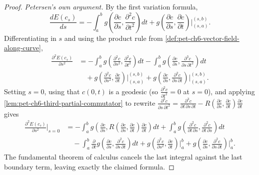 \begin{proof}
  \emph{Petersen's own argument.}
  By the first variation formula,
  \[
    \frac{dE(c_s)}{ds}=-\int_a^bg\!\left(\frac{\partial c}{\partial s},
    \frac{\partial^2c}{\partial t^2}\right)dt
    +g\!\left(\frac{\partial c}{\partial s},\frac{\partial c}{\partial t}\right)\Big|_{(s,a)}^{(s,b)}.
  \]
  Differentiating in $s$ and using the product rule from
  \cref{def:pet-ch6-vector-field-along-curve},
  \begin{align*}
    \frac{\partial^2E(c_s)}{\partial s^2}
    &=-\int_a^bg\!\left(\frac{\partial^2c}{\partial s^2},\frac{\partial^2c}{\partial t^2}\right)dt
    -\int_a^bg\!\left(\frac{\partial c}{\partial s},
    \frac{\partial^3c}{\partial s\,\partial t^2}\right)dt\\
    &\quad+g\!\left(\frac{\partial^2c}{\partial s^2},\frac{\partial c}{\partial t}\right)\Big|_{(s,a)}^{(s,b)}
    +g\!\left(\frac{\partial c}{\partial s},\frac{\partial^2c}{\partial s\,\partial t}\right)\Big|_{(s,a)}^{(s,b)}.
  \end{align*}
  Setting $s=0$, using that $c(0,t)$ is a geodesic (so
  $\frac{\partial^2c}{\partial t^2}=0$ at $s=0$), and applying
  \cref{lem:pet-ch6-third-partial-commutator} to rewrite
  $\frac{\partial^3c}{\partial s\,\partial t^2}
  =\frac{\partial^3c}{\partial t\,\partial s\,\partial t}
  -R\!\left(\frac{\partial c}{\partial s},\frac{\partial c}{\partial t}\right)\frac{\partial c}{\partial t}$
  gives
  \begin{align*}
    \frac{\partial^2E(c_s)}{\partial s^2}\bigg|_{s=0}
    &=-\int_a^bg\!\left(\frac{\partial c}{\partial s},R\!\left(\frac{\partial c}{\partial s},
    \frac{\partial c}{\partial t}\right)\frac{\partial c}{\partial t}\right)dt
    +\int_a^bg\!\left(\frac{\partial^2c}{\partial t\,\partial s},\frac{\partial^2c}{\partial t\,\partial s}\right)dt\\
    &\quad-\int_a^b\frac{\partial}{\partial t}g\!\left(\frac{\partial c}{\partial s},
    \frac{\partial^2c}{\partial s\,\partial t}\right)dt
    +g\!\left(\frac{\partial^2c}{\partial s^2},\frac{\partial c}{\partial t}\right)\Big|_a^b
    +g\!\left(\frac{\partial c}{\partial s},\frac{\partial^2c}{\partial s\,\partial t}\right)\Big|_a^b.
  \end{align*}
  The fundamental theorem of calculus cancels the last integral against the
  last boundary term, leaving exactly the claimed formula.
\end{proof}

